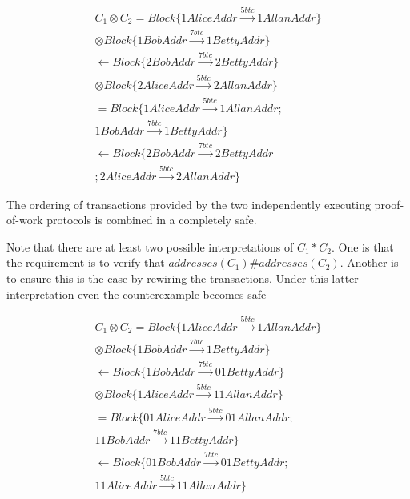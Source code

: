 \documentclass[]{acm_proc_article-sp}
\numberwithin{equation}{subsection}
\begin{document}
\begin{equation*}
  \begin{aligned} 
    C_1 \otimes C_2  = Block\{ 1AliceAddr \xrightarrow{5btc} 1AllanAddr \} \\
    \otimes Block\{ 1BobAddr \xrightarrow{7btc} 1BettyAddr \}  \\
    \leftarrow Block\{ 2BobAddr \xrightarrow{7btc} 2BettyAddr \} \\
    \otimes Block\{ 2AliceAddr \xrightarrow{5btc} 2AllanAddr \}\\
    = Block\{ 1AliceAddr \xrightarrow{5btc} 1AllanAddr ; \\
    1BobAddr \xrightarrow{7btc} 1BettyAddr \} \\
    \leftarrow Block\{ 2BobAddr \xrightarrow{7btc} 2BettyAddr \\
    ; 2AliceAddr \xrightarrow{5btc} 2AllanAddr \}
  \end{aligned}
\end{equation*}

The ordering of transactions provided by the two independently
executing proof-of-work protocols is combined in a completely safe.

Note that there are at least two possible interpretations of $C_1 *
C_2$. One is that the requirement is to verify that $addresses( C_1 ) \#
addresses( C_2 )$. Another is to ensure this is the case by rewiring the
transactions. Under this latter interpretation even the counterexample
becomes safe

\begin{equation*}
  \begin{aligned} 
    C_1 \otimes C_2  =  Block\{ 1AliceAddr \xrightarrow{5btc} 1AllanAddr \} \\
    \otimes Block\{ 1BobAddr \xrightarrow{7btc} 1BettyAddr \} \\
    \leftarrow Block\{ 1BobAddr \xrightarrow{7btc} 01BettyAddr \} \\
    \otimes Block\{ 1AliceAddr \xrightarrow{5btc} 11AllanAddr \} \\
    = Block\{ 01AliceAddr \xrightarrow{5btc} 01AllanAddr ; \\
    11BobAddr \xrightarrow{7btc} 11BettyAddr \} \\
    \leftarrow Block\{ 01BobAddr \xrightarrow{7btc} 01BettyAddr ; \\
    11AliceAddr \xrightarrow{5btc} 11AllanAddr \}
  \end{aligned}
\end{equation*}
\end{document}
